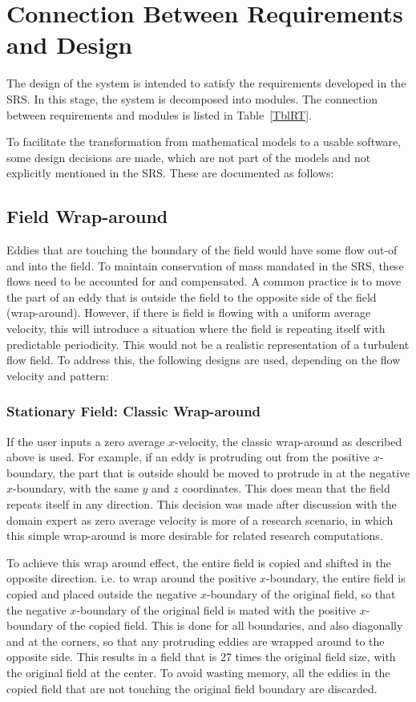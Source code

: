 \documentclass[12pt, titlepage]{article}
\begin{document}
\section{Connection Between Requirements and Design} \label{SecConnection}

The design of the system is intended to satisfy the requirements developed in
the SRS. In this stage, the system is decomposed into modules. The connection
between requirements and modules is listed in Table~\ref{TblRT}.

To facilitate the transformation from mathematical models to a usable software, some design decisions are made, which are not part of the models and not explicitly mentioned in the SRS. These are documented as follows:

\subsection{Field Wrap-around}
Eddies that are touching the boundary of the field would have some flow out-of and into the field. To maintain conservation of mass mandated in the SRS, these flows need to be accounted for and compensated. A common practice is to move the part of an eddy that is outside the field to the opposite side of the field (wrap-around). However, if there is field is flowing with a uniform average velocity, this will introduce a situation where the field is repeating itself with predictable periodicity. This would not be a realistic representation of a turbulent flow field. To address this, the following designs are used, depending on the flow velocity and pattern:

\subsubsection{Stationary Field: Classic Wrap-around}
If the user inputs a zero average $x$-velocity, the classic wrap-around as described above is used. For example, if an eddy is protruding out from the positive $x$-boundary, the part that is outside should be moved to protrude in at the negative $x$-boundary, with the same $y$ and $z$ coordinates. This does mean that the field repeats itself in any direction. This decision was made after discussion with the domain expert as zero average velocity is more of a research scenario, in which this simple wrap-around is more desirable for related research computations.

To achieve this wrap around effect, the entire field is copied and shifted in the opposite direction. i.e. to wrap around the positive $x$-boundary, the entire field is copied and placed outside the negative $x$-boundary of the original field, so that the negative $x$-boundary of the original field is mated with the positive $x$-boundary of the copied field. This is done for all boundaries, and also diagonally and at the corners, so that any protruding eddies are wrapped around to the opposite side. This results in a field that is 27 times the original field size, with the original field at the center. To avoid wasting memory, all the eddies in the copied field that are not touching the original field boundary are discarded.
\end{document}
